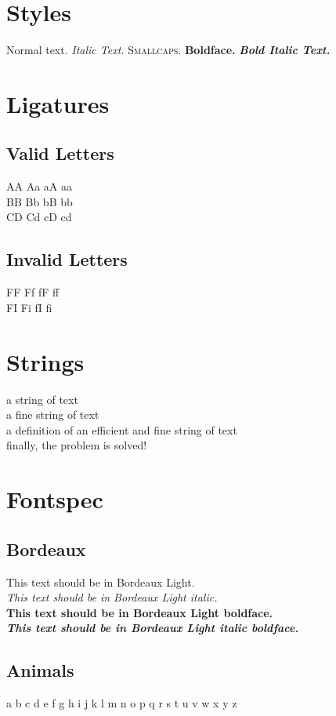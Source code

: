 \documentclass[12pt]{article}
\newcommand\animals[1]{\bgroup\animalsfont#1\egroup}
\begin{document}
\section{Styles}
Normal text.  \textit{Italic Text.}  \textsc{Smallcaps.}  \textbf{Boldface.}  \textit{\textbf{Bold Italic Text.}}

\section{Ligatures}
\subsection{Valid Letters}
AA Aa aA aa\\
BB Bb bB bb\\
CD Cd cD cd\\
\subsection{Invalid Letters}
FF Ff fF ff\\
FI Fi fI fi\\

\section{Strings}
a string of text\\
a fine string of text\\
a definition of an efficient and fine string of text\\
finally, the problem is solved!\\

\section{Fontspec}
\subsection{Bordeaux}
{\bordeauxfont This text should be in Bordeaux Light.}\\
{\bordeauxfont \textit{This text should be in Bordeaux Light italic.}}\\
{\bordeauxfont \textbf{This text should be in Bordeaux Light boldface.}}\\
{\bordeauxfont \textbf{\textit{This text should be in Bordeaux Light italic boldface.}}}

\subsection{Animals}
\animals{\Huge a b c d e f g h i j k l m n o p q r s t u v w x y z}
\end{document}
